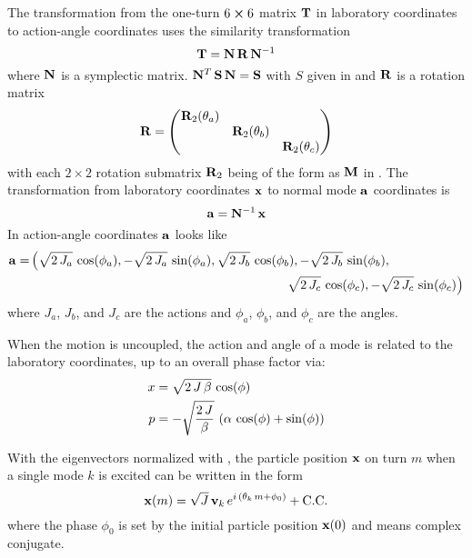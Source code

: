 The transformation from the one-turn $6 \mathbin{\boldsymbol{\times}} 6$ matrix ${\bf T}$ in laboratory coordinates to
action-angle coordinates uses the similarity transformation
\begin{equation}
  {\bf T} = {\bf N} \, {\bf R} \, {\bf N}^{-1}
\end{equation}
where ${\bf N}$ is a symplectic matrix. ${\bf N}^T \, {\bf S} \, {\bf N} = {\bf S}$ with $S$ given in 
and ${\bf R}$ is a rotation matrix
\begin{equation}
  {\bf R} = \begin{pmatrix}
    {\bf R}_2(\theta_a) &                  &                  \\
                     & {\bf R}_2(\theta_b) &                  \\
                     &                  & {\bf R}_2(\theta_c)
  \end{pmatrix}
\end{equation}
with each $2 \times 2$ rotation submatrix ${\bf R}_2$ being of the form as ${\bf M}$ in .
The transformation from laboratory coordinates ${\bf x}$ to normal mode ${\bf a}$ coordinates is
\begin{equation}
  {\bf a} = {\bf N}^{-1} \, {\bf x}
\end{equation}
In action-angle coordinates ${\bf a}$ looks like
\begin{align}
  \bfa = &\left( \sqrt{2 \, J_a} \, \cos(\phi_a), -\sqrt{2 \, J_a} \, \sin(\phi_a), 
                 \sqrt{2 \, J_b} \, \cos(\phi_b), -\sqrt{2 \, J_b} \, \sin(\phi_b), \right. \\
        &\hskip20em \left. 
                 \sqrt{2 \, J_c} \, \cos(\phi_c), -\sqrt{2 \, J_c} \, \sin(\phi_c) 
         \right) \nonumber
\end{align}
where $J_a$, $J_b$, and $J_c$ are the actions and $\phi_a$, $\phi_b$, and $\phi_c$ are the angles.

When the motion is uncoupled, the action and angle of a mode is related to the laboratory coordinates, up
to an overall phase factor via:
\begin{align}
  x &= \sqrt{2 \, J \, \beta} \, \cos( \phi ) \nonumber \\
  p &= -\sqrt{\frac{2 \, J}{\beta}} \, \left( \alpha \, \cos( \phi ) + \sin( \phi ) \right) \nonumber \\
\end{align}

With the eigenvectors normalized with , the particle position ${\bf x}$ on turn $m$ when a
single mode $k$ is excited can be written in the form
\begin{equation}
  {\bf x}(m) = \sqrt{J} \, {\bf v}_k \, e^{i \, (\theta_k \, m + \phi_0)} + \text{C.C.}
  \label{x2jv}
\end{equation}
where the phase $\phi_0$ is set by the initial particle position ${\bf x}(0)$ and  means
complex conjugate.

